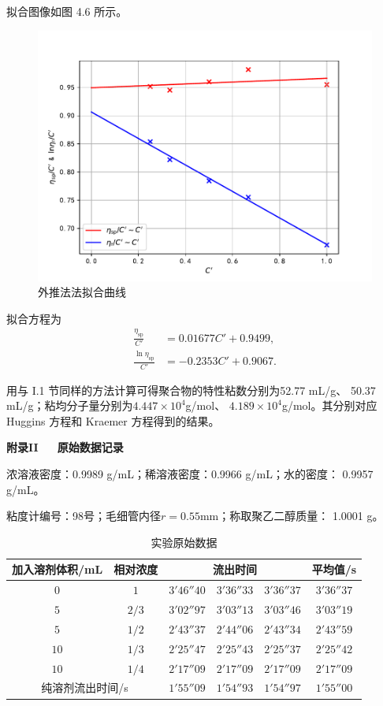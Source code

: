 \documentclass[12pt]{ctexart}
\numberwithin{equation}{section}
\begin{document}
拟合图像如图 4.6 所示。
\begin{figure}[!h]
    \centering
    \includegraphics[scale=0.8]{fitting3.pdf}
    \caption{外推法法拟合曲线}
\end{figure}

拟合方程为
\begin{align}
    \frac{\eta_\text{sp}}{C'} &= 0.01677 C' + 0.9499,
    \tag{I.12} \\
    \frac{\ln\eta_\text{sp}}{C'} &= -0.2353 C' + 0.9067.
    \tag{I.13}
\end{align}

用与 I.1 节同样的方法计算可得聚合物的特性粘数分别为52.77 mL/g、
50.37 mL/g；粘均分子量分别为$4.447\times 10^{4}$g/mol、
$4.189\times 10^{4}$g/mol。其分别对应 Huggins 方程和 Kraemer
方程得到的结果。

\newpage
\begin{center}
    \Large\bfseries{附录II~~~原始数据记录}
\end{center}

浓溶液密度：0.9989 g/mL；稀溶液密度：0.9966 g/mL；水的密度：
0.9957 g/mL。

粘度计编号：98号；毛细管内径$r = 0.55$mm；称取聚乙二醇质量：
1.0001 g。

\begin{longtable}{cccccc}
    \caption{实验原始数据} \\
    \hline
    加入溶剂体积/mL & 相对浓度 & \multicolumn{3}{c}{流出时间} & 平均值/s \\
    \hline
    $0 $ & $ 1 $ & $3'46''40$ & $3'36''33$ & $3'36''37$ & $3'36''37$ \\
    $5 $ & $2/3$ & $3'02''97$ & $3'03''13$ & $3'03''46$ & $3'03''19$ \\
    $5 $ & $1/2$ & $2'43''37$ & $2'44''06$ & $2'43''34$ & $2'43''59$ \\
    $10$ & $1/3$ & $2'25''47$ & $2'25''43$ & $2'25''37$ & $2'25''42$ \\
    $10$ & $1/4$ & $2'17''09$ & $2'17''09$ & $2'17''09$ & $2'17''09$ \\
    \hline
    \multicolumn{2}{c}{纯溶剂流出时间/s}
                 & $1'55''09$ & $1'54''93$ & $1'54''97$ & $1'55''00$ \\
    \hline
\end{longtable}
\end{document}
